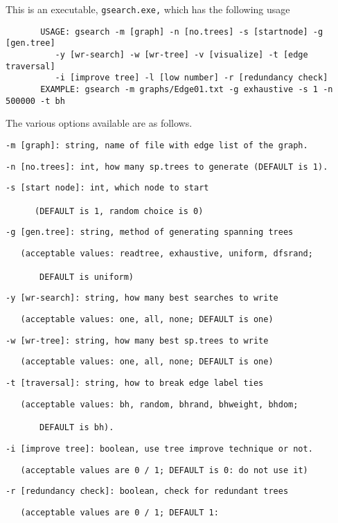 \documentclass[11pt]{article}\usepackage{amsmath}
\begin{document}
This is an executable, \texttt{gsearch.exe,} which has the following usage

\bigskip
\begin{verbatim}
       USAGE: gsearch -m [graph] -n [no.trees] -s [startnode] -g [gen.tree] 
          -y [wr-search] -w [wr-tree] -v [visualize] -t [edge traversal]
          -i [improve tree] -l [low number] -r [redundancy check]
       EXAMPLE: gsearch -m graphs/Edge01.txt -g exhaustive -s 1 -n 500000 -t bh
\end{verbatim}

\bigskip

The various options available are as follows.

\bigskip

\texttt{-m [graph]: string, name of file with edge list of the graph.}

\texttt{-n [no.trees]: int, how many sp.trees to generate (DEFAULT is 1).}

\texttt{-s [start node]: int, which node to start }

\ \ \ \ \ \ \texttt{(DEFAULT is 1, random choice is 0)}

\texttt{-g [gen.tree]: string, method of generating spanning trees}

\texttt{ \ \ (acceptable values: readtree, exhaustive, uniform, dfsrand; }

\ \ \ \ \ \ \ \texttt{DEFAULT is uniform)}

\texttt{-y [wr-search]: string, how many best searches to write}

\texttt{ \ \ (acceptable values: one, all, none; DEFAULT is one)}

\texttt{-w [wr-tree]: string, how many best sp.trees to write}

\texttt{ \ \ (acceptable values: one, all, none; DEFAULT is one)}

\texttt{-t [traversal]: string, how to break edge label ties}

\texttt{ \ \ (acceptable values: bh, random, bhrand, bhweight, bhdom; }

\ \ \ \ \ \ \ \texttt{DEFAULT is bh).}

\texttt{-i [improve tree]: boolean, use tree improve technique or not.}

\texttt{ \ \ (acceptable values are 0 / 1; DEFAULT is 0: do not use it)}

\texttt{-r [redundancy check]: boolean, check for redundant trees}

\texttt{ \ \ (acceptable values are 0 / 1; DEFAULT 1: }
\end{document}
